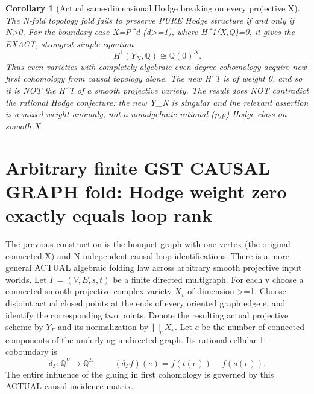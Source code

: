 \documentclass[11pt]{article}
\newcommand{\Q}{\mathbb Q}
\newtheorem{corollary}[theorem]{Corollary}
\begin{document}
\begin{corollary}[Actual same-dimensional Hodge breaking on every projective X]
The N-fold topology fold fails to preserve
PURE Hodge structure if and only if N>0.
For the boundary case X=P^d (d>=1),
where H^1(X,Q)=0, it gives the EXACT,
strongest simple equation
\[
 \boxed{H^1(Y_N,\Q)\cong\Q(0)^N.}                 \tag{6}
\]
Thus even varieties with completely
algebraic even-degree cohomology acquire
new first cohomology from causal topology alone.
The new H^1 is of weight 0, and so it is
NOT the H^1 of a smooth projective variety.
The result does NOT contradict the
rational Hodge conjecture: the new Y_N
is singular and the relevant assertion is
a mixed-weight anomaly, not a nonalgebraic
rational (p,p) Hodge class on smooth X.
\end{corollary}

\section{Arbitrary finite GST CAUSAL GRAPH fold: Hodge weight zero exactly equals loop rank}
The previous construction is the bouquet graph
with one vertex (the original connected X)
and N independent causal loop identifications.
There is a more general ACTUAL algebraic folding
law across arbitrary smooth projective input worlds.
Let \(\Gamma=(V,E,s,t)\)
be a finite directed multigraph.
For each v choose a connected smooth projective
complex variety \(X_v\) of dimension >=1.
Choose disjoint actual closed points at the ends
of every oriented graph edge e, and identify the
corresponding two points. Denote the resulting
actual projective scheme by \(Y_\Gamma\)
and its normalization by \(\bigsqcup_v X_v\).
Let \(c\) be the number of connected components
of the underlying undirected graph.
Its rational cellular 1-coboundary is
\[
 \boxed{\delta_\Gamma:\Q^{V}\to\Q^E,\qquad
 (\delta_\Gamma f)(e)=f(t(e))-f(s(e)).}           \tag{7}
\]
The entire influence of the gluing in first
cohomology is governed by this ACTUAL
causal incidence matrix.
\end{document}

